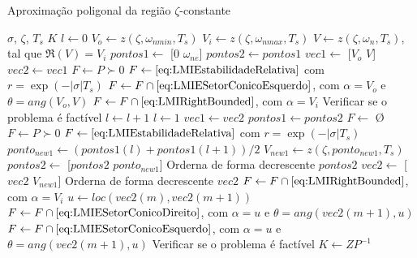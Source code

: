 \begin{algorithm}[ht!]
  \caption{Aproximação poligonal da região $\zeta$-constante}\label{alg:AproximacaoPoligonalZeta}
  \begin{algorithmic}[1]
    \Require $\sigma$, $\zeta$, $T_s$
    \Ensure $K$
    \State $l \gets 0$
    \State $V_o \gets z(\zeta,\omega_{nmin},T_s)$
    \State $V_i \gets z(\zeta,\omega_{nmax},T_s)$
    \State $V \gets z(\zeta,\omega_n,T_s)$, tal que $\Re{(V)} = V_i$
    \State $pontos1 \gets$ [$0$ $\omega_{ne}$]
    \State $pontos2 \gets pontos1$
    \State $vec1 \gets$ [$V_o$ $V$]
    \State $vec2 \gets vec1$
    \State $F \gets P \succ 0$
    \State $F \gets \eqref{eq:LMIEstabilidadeRelativa}$ com $r = \exp{\left(-|\sigma|T_s\right)}$ 
    \State $F \gets F \cap \eqref{eq:LMIESetorConicoEsquerdo}$, com $\alpha = V_o$ e $\theta = ang(V_o,V)$ 
    \State $F \gets F \cap \eqref{eq:LMIRightBounded}$, com $\alpha = V_i$ 
    \State Verificar se o problema é factível
        \State $l \gets l + 1$
      \Else
        \State $l \gets 1$
        \State $vec1 \gets vec2$
        \State $pontos1 \gets pontos2$
      \EndIf
        \State $F \gets$ \O {}
        \State $F \gets P \succ 0$
        \State $F \gets \eqref{eq:LMIEstabilidadeRelativa}$ com $r = \exp{\left(-|\sigma|T_s\right)}$ 
        \State $ponto_{new1} \gets (pontos1(l)+pontos1(l+1))/2$
        \State $V_{new1} \gets z(\zeta, ponto_{new1}, T_s)$
        \State $pontos2 \gets$ [$pontos2$ $ponto_{new1}$]
        \State Orderna de forma decrescente $pontos2$
        \State $vec2 \gets$ [$vec2$ $V_{new1}$]
        \State Orderna de forma decrescente $vec2$
        \State $F \gets F \cap \eqref{eq:LMIRightBounded}$, com $\alpha = V_i$ 
          \State $u \gets loc(vec2(m),vec2(m+1))$
            \State $F\gets F \cap \eqref{eq:LMIESetorConicoDireito}$, com $\alpha = u$ e $\theta = ang(vec2(m+1),u)$ 
          \Else
            \State $F\gets F \cap \eqref{eq:LMIESetorConicoEsquerdo}$, com $\alpha = u$ e $\theta = ang(vec2(m+1),u)$ 
          \EndIf
        \EndFor
        \State Verificar se o problema é factível 
    \EndWhile
    \State $K \gets ZP^{-1}$
  \end{algorithmic}
\end{algorithm} 

